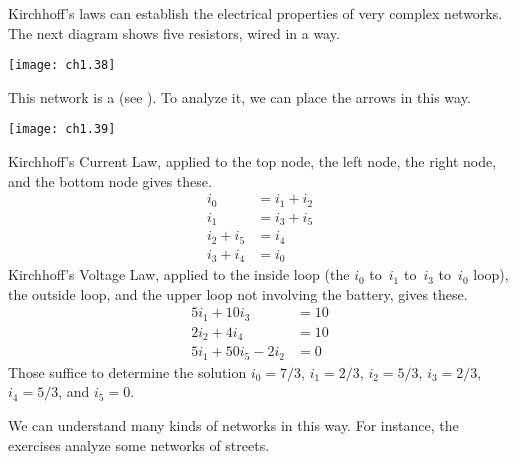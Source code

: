 Kirchhoff's laws can 
establish the electrical properties of very complex networks.
The next diagram shows
five resistors, wired in 
a  
way.
\begin{center}
  \texttt{[image: ch1.38]}
\end{center}
This network is a  
(see ).
To analyze it, we can place the arrows in this way.
\begin{center}
  \texttt{[image: ch1.39]}
\end{center}
Kirchhoff's Current Law, applied to the
top node, the left node, the right node, and the bottom node gives
these.
\begin{align*}
   i_0     &=  i_1+i_2  \\
   i_1     &=  i_3+i_5  \\
   i_2+i_5 &=  i_4      \\
   i_3+i_4 &=  i_0
\end{align*} 
Kirchhoff's Voltage Law,
applied to the inside loop (the $i_0$ to~$i_1$ to~$i_3$ to~$i_0$ loop), 
the outside loop, 
and the upper loop not involving the battery, gives these.  
\begin{align*}
      5i_1+10i_3  &= 10   \\
      2i_2+4i_4   &= 10   \\
      5i_1+50i_5-2i_2  &= 0     
\end{align*} 
Those suffice to determine the solution 
$i_0=7/3$, $i_1=2/3$, $i_2=5/3$, 
$i_3=2/3$, $i_4=5/3$, and $i_5=0$. 

We can understand many kinds of networks in this way.
For instance, the exercises analyze some networks of streets.
 
